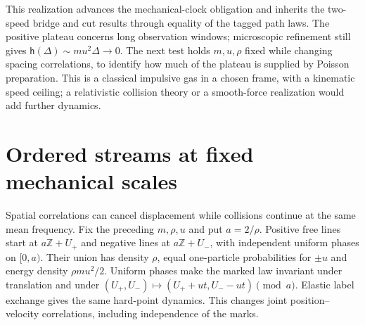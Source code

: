 \documentclass[11pt,a4paper]{article}
\begin{document}
This realization advances the mechanical-clock obligation and inherits the
two-speed bridge and cut results through equality of the tagged path laws.
The positive plateau concerns long observation windows; microscopic refinement
still gives $\mathsf h(\Delta)\sim mu^2\Delta\to0$. The next test holds
$m,u,\rho$ fixed while changing spacing correlations, to identify how much of
the plateau is supplied by Poisson preparation. This is a classical impulsive
gas in a chosen frame, with a kinematic speed ceiling; a relativistic collision
theory or a smooth-force realization would add further dynamics.

\section{Ordered streams at fixed mechanical scales}\label{sec:ordered}
Spatial correlations can cancel displacement while collisions continue at
the same mean frequency. Fix the preceding $m,\rho,u$ and put $a=2/\rho$.
Positive free lines start at $a\mathbb Z+U_+$ and negative lines at
$a\mathbb Z+U_-$, with independent uniform phases on $[0,a)$.
Their union has density $\rho$, equal one-particle probabilities for $\pm u$
and energy density $\rho mu^2/2$. Uniform phases make the marked law
invariant under translation and under
$(U_+,U_-)\mapsto(U_++ut,U_--ut)\pmod a$.
Elastic label exchange gives the same hard-point dynamics. This changes
joint position--velocity correlations, including independence of the marks.
\end{document}
